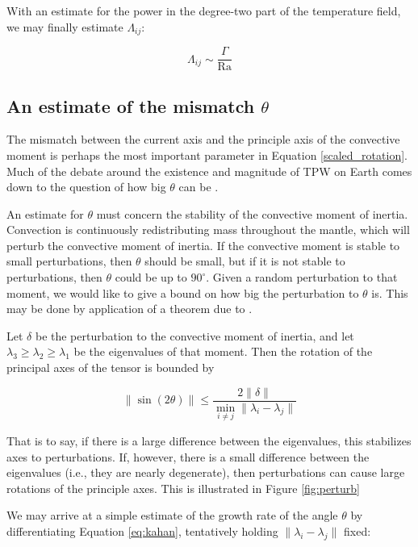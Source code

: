 \documentclass[extra,onecolumn]{gji}
\begin{document}
With an estimate for the power in the degree-two part of the temperature field, we may finally estimate $\Lambda_{ij}$:

\begin{equation}
\Lambda_{ij} \sim \frac{\Gamma}{\mathrm{Ra} }
\end{equation}


\subsection{An estimate of the mismatch $\theta$}

The mismatch between the current axis and the principle axis of the convective moment is perhaps the most important parameter in Equation \ref{scaled_rotation}.  
Much of the debate around the existence and magnitude of TPW on Earth comes down to the question of how big $\theta$ can be \citep{kirschvink1997evidence, steinberger1997changes}.

An estimate for $\theta$ must concern the stability of the convective moment of inertia. 
Convection is continuously redistributing mass throughout the mantle, which will perturb the convective moment of inertia.  
If the convective moment is stable to small perturbations, then $\theta$ should be small, but if it is not stable to perturbations, then $\theta$ could be up to $90^\circ$. 
Given a random perturbation to that moment, we would like to give a bound on how big the perturbation to $\theta$ is. 
This may be done by application of a theorem due to \citet{davis1970rotation}.

Let $\delta$ be the perturbation to the convective moment of inertia, and let $\lambda_3 \ge \lambda_2 \ge \lambda_1$ be the eigenvalues of that moment.  
Then the rotation of the principal axes of the tensor is bounded by

\begin{equation}
\lVert \sin(2 \theta) \rVert \le \frac{ 2 \lVert \delta \rVert}{ \displaystyle \min_{i \neq j} \lVert \lambda_i - \lambda_j \rVert }
\label{eq:kahan}
\end{equation} 

That is to say, if there is a large difference between the eigenvalues, this stabilizes axes to perturbations.  
If, however, there is a small difference between the eigenvalues (i.e., they are nearly degenerate), then perturbations can cause large rotations of the principle axes.
This is illustrated in Figure \ref{fig:perturb}


We may arrive at a simple estimate of the growth rate of the angle $\theta$ by differentiating Equation \ref{eq:kahan}, tentatively holding $\lVert \lambda_i - \lambda_j \rVert$ fixed:
\end{document}
